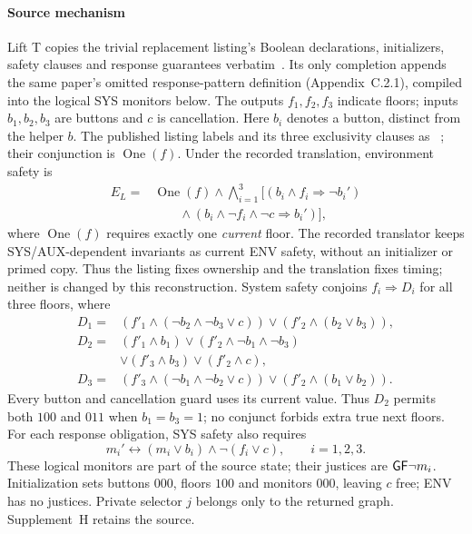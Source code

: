 
\paragraph{Source mechanism}
Lift T copies the trivial replacement listing's Boolean declarations,
initializers, safety clauses and response guarantees verbatim~\cite{degradation}.
Its only completion appends the same paper's omitted response-pattern
definition (Appendix~C.2.1), compiled into the logical SYS monitors below.
The outputs $f_1,f_2,f_3$ indicate floors; inputs $b_1,b_2,b_3$ are
buttons and $c$ is cancellation. Here $b_i$ denotes a button, distinct
from the helper $b$. The published listing labels  and
its three exclusivity clauses as ~\cite[Appendix~C.3.3,
lines~36--46]{degradation}; their conjunction is $\operatorname{One}(f)$.
Under the recorded translation, environment safety is
\[
\begin{aligned}
E_L={}&\operatorname{One}(f)\land\bigwedge_{i=1}^{3}
\bigl[(b_i\land f_i\Rightarrow\neg b_i')\\
&\qquad\land(b_i\land\neg f_i\land\neg c\Rightarrow b_i')\bigr],
\end{aligned}
\]
where $\operatorname{One}(f)$ requires exactly one \emph{current} floor.
The recorded translator keeps SYS/AUX-dependent invariants as current
ENV safety, without an initializer or primed copy. Thus the listing
fixes ownership and the translation fixes timing; neither is changed
by this reconstruction.
System safety conjoins $f_i\Rightarrow D_i$ for all three floors, where
\[
\begin{aligned}
D_1={}&(f'_1\land(\neg b_2\land\neg b_3\lor c))
       \lor(f'_2\land(b_2\lor b_3)),\\
D_2={}&(f'_1\land b_1)\lor(f'_2\land\neg b_1\land\neg b_3)\\
 &\lor(f'_3\land b_3)\lor(f'_2\land c),\\
D_3={}&(f'_3\land(\neg b_1\land\neg b_2\lor c))
       \lor(f'_2\land(b_1\lor b_2)).
\end{aligned}
\]
Every button and cancellation guard uses its current value. Thus $D_2$
permits both $100$ and $011$ when $b_1=b_3=1$; no conjunct forbids
extra true next floors. For each response obligation, SYS safety also requires
\[
 m_i'\leftrightarrow(m_i\lor b_i)\land\neg(f_i\lor c),
 \qquad i=1,2,3.
\]
These logical monitors are part of the source state; their justices are
$\mathsf{G}\mathsf{F}\neg m_i$. Initialization sets buttons $000$, floors $100$ and
monitors $000$, leaving $c$ free; ENV has no justices. Private selector
$j$ belongs only to the returned graph. Supplement~H retains the source.

